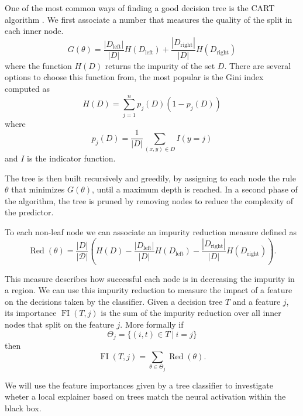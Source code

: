 \documentclass[]{marticle}
\newcommand{\ds}{\mathcal{D}}
\DeclareMathOperator{\Red}{Red}
\DeclareMathOperator{\FI}{FI}
\begin{document}
One of the most common ways of finding a good decision tree is the CART algorithm
\cite{tibsharani-elements}. We first associate a number that measures the quality of the split in
each inner node.
\begin{equation*}
    G(\theta) = \frac{|D_\text{left}|}{|D|} H(D_\text{left}) + \frac{|D_\text{right}|}{|D|}
    H(D_\text{right})
\end{equation*}
where the function $H(D)$ returns the impurity of the set $D$. There are several options to choose
this function from, the most popular is the Gini index computed as 
\begin{equation*}
    H(D) = \sum_{j=1}^n p_j(D)\left(1-p_j(D)\right)
\end{equation*}
where
\begin{equation*}
    p_j(D) = \frac{1}{|D|}\sum_{(x,y)\in D}I(y = j)
\end{equation*}
and $I$ is the indicator function.

The tree is then built recursively and greedily, by assigning to each node the rule $\theta$ that
minimizes $G(\theta)$, until a maximum depth is reached. In a second phase of the algorithm, the
tree is pruned by removing nodes to reduce the complexity of the predictor.

To each non-leaf node we can associate an impurity reduction measure defined as 
\begin{equation*}
    \Red(\theta) = \frac{|D|}{|\ds|} \left( H(D) - \frac{|D_\text{left}|}{|D|}H(D_\text{left})  -
    \frac{|D_\text{right}|}{|D|}H(D_\text{right}) \right).
\end{equation*}

This measure describes how successful each node is in decreasing the impurity in a region. We can
use this impurity reduction to measure the impact of a feature on the decisions taken by the
classifier. Given a decision tree $T$ and a feature $j$, its importance $\FI(T, j)$ is the sum of
the impurity reduction over all inner nodes that split on the feature $j$. More formally if 
\begin{equation*}
    \Theta_j = \{(i, t) \in T \ |\ i = j\}
\end{equation*}
then 
\begin{equation*}
    \FI(T, j) = \sum_{\theta \in \Theta_j} \Red(\theta).
\end{equation*}

We will use the feature importances given by a tree classifier to investigate wheter a local
explainer based on trees match the neural activation within the black box.
\end{document}
